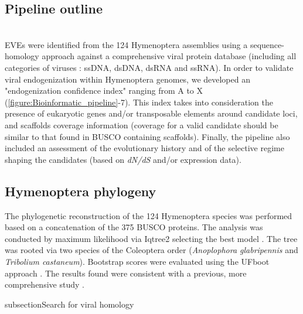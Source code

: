 \subsection{Pipeline outline}
\label{sec:MM-2}\\
EVEs were identified from the 124 Hymenoptera assemblies using a sequence-homology approach against a comprehensive viral protein database (including all categories of viruses : ssDNA, dsDNA, dsRNA and ssRNA). In order to validate viral endogenization within Hymenoptera genomes, we developed an "endogenization confidence index" ranging from A to X (\figurename{\ref{figure:Bioinformatic_pipeline}}-7). This index takes into consideration the presence of eukaryotic genes and/or transposable elements around candidate loci, and scaffolds coverage information (coverage for a valid candidate should be similar to that found in BUSCO containing scaffolds). Finally, the pipeline also included an assessment of the evolutionary history and of the selective regime shaping the candidates (based on \textit{dN/dS} and/or expression data).

\subsection{Hymenoptera phylogeny}
\label{sec:MM-3}

The phylogenetic reconstruction of the 124 Hymenoptera species was performed based on a concatenation of the 375 BUSCO proteins. The analysis was conducted by maximum likelihood via Iqtree2 \citep{minh_iq-tree_2020} selecting the best model \citep{kalyaanamoorthy_modelfinder_2017}. The tree was rooted via two species of the Coleoptera order (\textit{Anoplophora glabripennis} and \textit{Tribolium castaneum}). Bootstrap scores were evaluated using the UFboot approach \citep{hoang_ufboot2_2018}. The results found were consistent with a previous, more comprehensive study \citep{peters_evolutionary_2017}. 

subsection{Search for viral homology}
\label{sec:MM-4}

